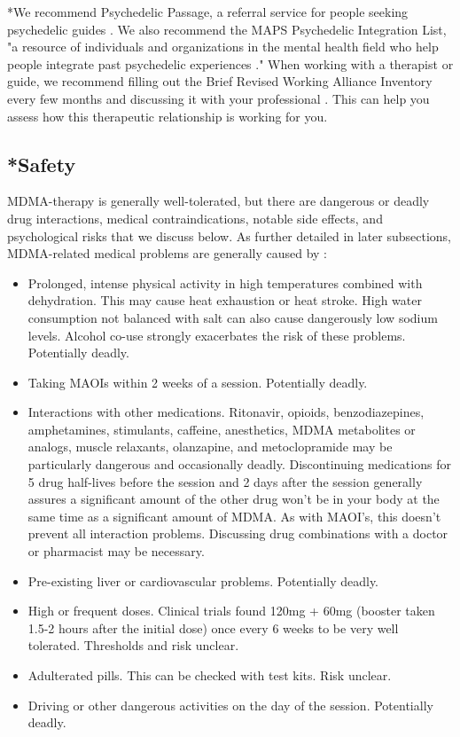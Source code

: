 \documentclass[12pt,letterpaper]{article}
\begin{document}
*We recommend Psychedelic Passage, a referral service for people seeking psychedelic guides \cite{psychedelicPassage}. We also recommend the MAPS Psychedelic Integration List, "a resource of individuals and organizations in the mental health field who help people integrate past psychedelic experiences \cite{mapsIntegrationList}." When working with a therapist or guide, we recommend filling out the Brief Revised Working Alliance Inventory every few months and discussing it with your professional \cite{BRWAIdownload,mallinckrodtBRWAI}. This can help you assess how this therapeutic relationship is working for you.
\subsection{*Safety}
\label{sec:safety}
MDMA-therapy is generally well-tolerated, but there are dangerous or deadly drug interactions, medical contraindications, notable side effects, and psychological risks that we discuss below. As further detailed in later subsections, MDMA-related medical problems are generally caused by \cite{riggDeaths,roxburghDeaths}:
\begin{itemize}
    \item Prolonged, intense physical activity in high temperatures combined with dehydration. This may cause heat exhaustion or heat stroke. High water consumption not balanced with salt can also cause dangerously low sodium levels. Alcohol co-use strongly exacerbates the risk of these problems. Potentially deadly.
    \item Taking MAOIs within 2 weeks of a session. Potentially deadly.
    \item Interactions with other medications. Ritonavir, opioids, benzodiazepines, amphetamines, stimulants, caffeine, anesthetics, MDMA metabolites or analogs, muscle relaxants, olanzapine, and metoclopramide may be particularly dangerous and occasionally deadly. Discontinuing medications for 5 drug half-lives before the session and 2 days after the session generally assures a significant amount of the other drug won't be in your body at the same time as a significant amount of MDMA. As with MAOI's, this doesn't prevent all interaction problems. Discussing drug combinations with a doctor or pharmacist may be necessary.
    \item Pre-existing liver or cardiovascular problems. Potentially deadly.
    \item High or frequent doses. Clinical trials found 120mg + 60mg (booster taken 1.5-2 hours after the initial dose) once every 6 weeks to be very well tolerated. Thresholds and risk unclear.
    \item Adulterated pills. This can be checked with test kits. Risk unclear.
    \item Driving or other dangerous activities on the day of the session. Potentially deadly.
\end{itemize}
\end{document}
